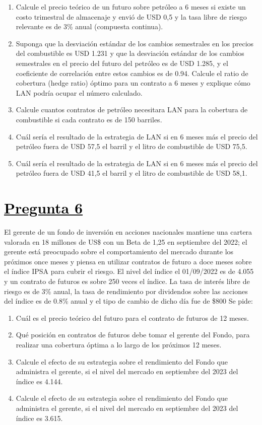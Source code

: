 \documentclass[12pt]{article}
\newcommand{\subrayadoRojo}[1]{{\color{rojoudp}\underline{\textcolor{black}{#1}}}}
\begin{document}
    \begin{enumerate}[label=\textbf{\alph*)}]
        \item Calcule el precio teórico de un futuro sobre petróleo a 6 meses si existe un costo trimestral de almacenaje y 
        envió de USD 0,5 y la tasa libre de riesgo relevante es de 3\% anual (compuesta continua).
        \item Suponga que la desviación estándar de los cambios semestrales en los precios del combustible es USD 1.231 y 
        que la desviación estándar de los cambios semestrales en el precio del futuro del petróleo es de USD 1.285, y el coeficiente 
        de correlación entre estos cambios es de 0.94. Calcule el ratio de cobertura (hedge ratio) óptimo para un contrato a 6 meses 
        y explique cómo LAN podría ocupar el número calculado.
        \item Calcule cuantos contratos de petróleo necesitara LAN para la cobertura de combustible si cada contrato es de 150 barriles.
        \item Cuál sería el resultado de la estrategia de LAN si en 6 meses más el precio del petróleo fuera de USD 57,5 el barril y el litro de combustible de USD 75,5.
        \item Cuál sería el resultado de la estrategia de LAN si en 6 meses más el precio del petróleo fuera de USD 41,5 el barril y el litro de combustible de USD 58,1.
\end{enumerate}

\section*{\subrayadoRojo{Pregunta 6}}
El gerente de un fondo de inversión en acciones nacionales mantiene una cartera valorada en 18 millones de US\$ con un Beta de 
1,25 en septiembre del 2022; el gerente está preocupado sobre el comportamiento del mercado durante los próximos once meses y 
piensa en utilizar contratos de futuro a doce meses sobre el índice IPSA para cubrir el riesgo. El nivel del índice el 01/09/2022 
es de 4.055 y un contrato de futuros es sobre 250 veces el índice. La tasa de interés libre de riesgo es de 3\% anual, la tasa de 
rendimiento por dividendos sobre las acciones del índice es de 0.8\% anual y el tipo de cambio de dicho día fue de \$800  Se pide:
\begin{enumerate}[label=\textbf{\alph*)}]
    \item Cuál es el precio teórico del futuro para el contrato de futuros de 12 meses.
    \item Qué posición en contratos de futuros debe tomar el gerente del Fondo, para realizar una cobertura óptima a lo largo de los próximos 12 meses.
    \item Calcule el efecto de su estrategia sobre el rendimiento del Fondo que administra el gerente, si el nivel del mercado en septiembre del 2023 del índice es 4.144.
    \item Calcule el efecto de su estrategia sobre el rendimiento del Fondo que administra el gerente, si el nivel del mercado en septiembre del 2023 del índice es 3.615.

\end{enumerate}
    
\end{document}
